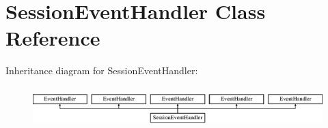 \hypertarget{class_session_event_handler}{}\section{Session\+Event\+Handler Class Reference}
\label{class_session_event_handler}
Inheritance diagram for Session\+Event\+Handler\+:\begin{figure}[H]
\begin{center}
\leavevmode
\includegraphics[height=1.588652cm]{class_session_event_handler}
\end{center}
\end{figure}
